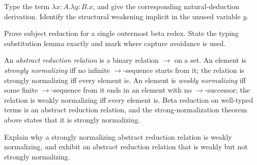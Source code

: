 \begin{exercise}
\label{ex:normalization-curry-howard-01}
Type the term \(\lambda x{:}A.\lambda y{:}B.x\), and give the corresponding
natural-deduction derivation.  Identify the structural weakening implicit in
the unused variable \(y\).
\end{exercise}

\begin{exercise}
\label{ex:normalization-curry-howard-02}
Prove subject reduction for a single outermost beta redex.  State the typing
substitution lemma exactly and mark where capture avoidance is used.
\end{exercise}

\begin{definition}
An \emph{abstract reduction relation} is a binary relation \(\to\) on a
set.  An element is \emph{strongly normalizing} iff no infinite
\(\to\)-sequence starts from it; the relation is strongly normalizing iff
every element is.  An element is \emph{weakly normalizing} iff some finite
\(\to\)-sequence from it ends in an element with no \(\to\)-successor;
the relation is weakly normalizing iff every element is.  Beta reduction on
well-typed terms is an abstract reduction relation, and the
strong-normalization theorem above states that it is strongly normalizing.
\end{definition}

\begin{exercise}
\label{ex:normalization-curry-howard-03}
Explain why a strongly normalizing abstract reduction relation is weakly
normalizing, and exhibit an abstract reduction relation that is weakly but
not strongly normalizing.
\end{exercise}

